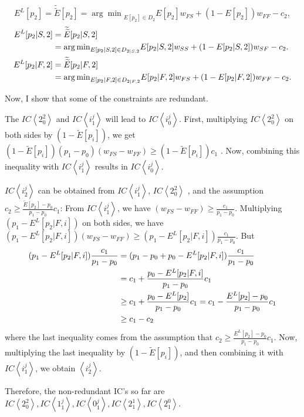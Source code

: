 \documentclass[11pt]{article} %
\theoremstyle{exampstyle}
\newcommand{\eq}[1]{\begin{align}#1\end{align}}
\newcommand{\la}{ \left < }
\newcommand{\ra}{ \right > }
\newcommand{\wtE}{ \widetilde{E}}
\begin{document}
\[ E^L[p_2]=\widetilde{\widetilde{E}}[p_2] = {\arg\min}_{E[p_2] \in D_2} E[p_2] w_{FS} + (1-E[p_2]) w_{FF} -c_2, \]
\eq{E^L[p_2|S,2] &=\widetilde{\widetilde{E}}[p_2|S,2] \notag \\
&= {\arg\min}_{E[p_2|S,2] \in D_{2|S,2}} E[p_2|S,2] w_{SS} + (1-E[p_2|S,2] ) w_{SF} -c_2 . \notag \\
E^L[p_2|F,2] &=\widetilde{\widetilde{E}}[p_2|F,2] \notag \\
&= {\arg\min}_{E[p_2|F,2] \in D_{2|F,2}} E[p_2|F,2] w_{FS} + (1-E[p_2|F,2] ) w_{FF} -c_2 . \notag \\
}


Now, I show that some of the constraints are redundant. 

The $IC \la 2^2_0 \ra$ and $IC \la i^j_1\ra $ will lead to $IC \la i^j_0 \ra$. First, multiplying  $IC \la 2^2_0 \ra$ on both sides by $(1-  \widetilde{E}[p_i] )$, we get $ (1-  \widetilde{E}[p_i] ) (p_1 - p_0) (w_{FS} - w_{FF}) \ge  (1-  \widetilde{E}[p_i] ) c_1$ . Now, combining this inequality with $IC \la i^j_1\ra$ results in $IC \la i^j_0 \ra $. 

$IC\la i^j_2\ra $ can be obtained from $IC \la i^j_1 \ra$, $IC \la 2^2_0 \ra$ ,  and the assumption $c_2 \ge \frac{ \wtE[p_2] - p_0}{p_1 - p_0} c_1$: From $IC \la i^j_1 \ra$, we have $(w_{FS}-w_{FF}) \ge \frac{c_1}{p_1-p_0}$. Multiplying $(p_1-E^L[p_2|F,i])$ on both sides, we have $(p_1 - E^L[p_2 | F,i]) (w_{FS} - w_{FF}) \ge (p_1 - E^L[p_2 | F,i]) \frac{c_1}{p_1-p_0}$. But
\eq{   (p_1 - E^L[p_2 | F,i]) \frac{c_1}{p_1-p_0} &= (p_1-p_0 +p_0-E^L[p_2 | F,i])  \frac{c_1}{p_1-p_0}   \notag \\
&= c_1 + \frac{p_0 - E^L[p_2 | F,i]}{p_1 -p_0} c_1 \notag \\
& \ge  c_1 + \frac{p_0 - E^L[p_2]}{p_1 -p_0} c_1 =  c_1 - \frac{E^L[p_2]-p_0}{p_1 -p_0} c_1 \notag \\
&\ge c_1 - c_2 \notag }
where the last inequality comes from the assumption that $c_2 \ge \frac{E^L[p_2]-p_0}{p_1 -p_0} c_1 $. Now, multiplying the last inequality by $(1-\widetilde{E}[p_i])$, and then combining it with $IC\la i^j_1 \ra$, we obtain $\la i^j_2 \ra$. 

Therefore, the non-redundant IC's so far are $IC \la 2^2_0 \ra, IC \la 1^j_1 \ra, IC \la 0^j_1 \ra, IC \la 2^1_1 \ra, IC \la 2^0_1 \ra$. 
\end{document}
